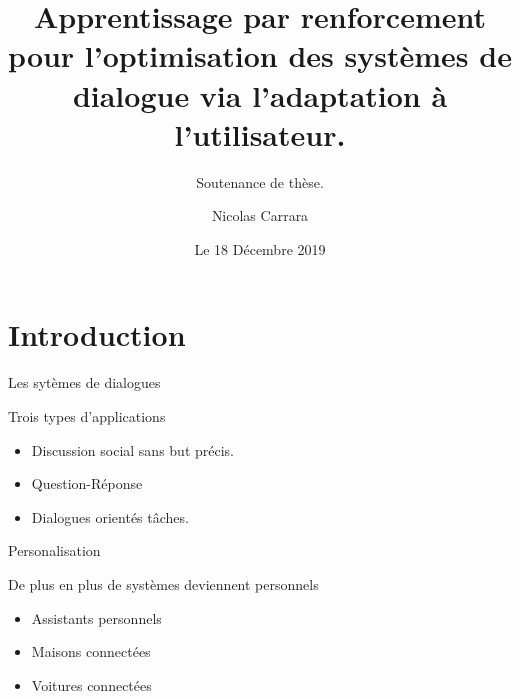 \documentclass[french]{beamer}
\title[TITLE]{Apprentissage par renforcement pour l'optimisation des systèmes de dialogue via l'adaptation à l'utilisateur.}
\subtitle{Soutenance de thèse.}
\author{Nicolas Carrara}
\institute[ULille]{Université de Lille}
\date{Le 18 Décembre 2019}
\begin{document}
    \begin{frame}
        \maketitle
        \centering
    \end{frame}

    \section{Introduction}

    \begin{frame}{Les sytèmes de dialogues}


    \end{frame}

    \begin{frame}{Trois types d'applications}

        \begin{itemize}
            \item Discussion social sans but précis.
            \item Question-Réponse
            \item Dialogues orientés tâches.
        \end{itemize}


    \end{frame}

    \begin{frame}{Personalisation}

        De plus en plus de systèmes deviennent personnels

        \begin{itemize}
            \item Assistants personnels %
            \item Maisons connectées %
            \item Voitures connectées
        \end{itemize}


    \end{frame}
\end{document}
